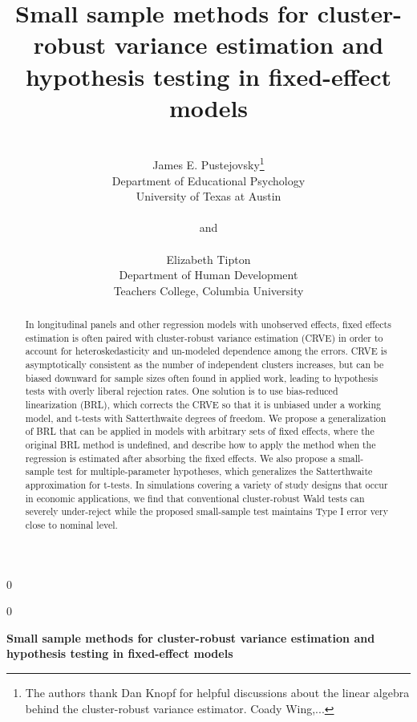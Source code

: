 \documentclass[12pt]{article}\usepackage[]{graphicx}\usepackage[]{color}
\newcommand{\blind}{0}
\begin{document}
\def\spacingset#1{\renewcommand{\baselinestretch}%
{#1}\small\normalsize} \spacingset{1}



\blind
{
  \title{\bf Small sample methods for cluster-robust variance estimation and hypothesis testing in fixed-effect models}
  \author{\\James E. Pustejovsky\thanks{
    The authors thank Dan Knopf for helpful discussions about the linear algebra behind the cluster-robust variance estimator. Coady Wing,...}\hspace{.2cm}\\
    Department of Educational Psychology \\ 
    University of Texas at Austin\\ \\
    and \\ \\
    Elizabeth Tipton \\
    Department of Human Development \\ 
    Teachers College, Columbia University}
  \maketitle
} \fi

\blind
{
  \bigskip
  \bigskip
  \bigskip
  \begin{center}
    {\LARGE\bf Small sample methods for cluster-robust variance estimation and hypothesis testing in fixed-effect models}
\end{center}
  \medskip
} \fi

\bigskip
\begin{abstract}
In longitudinal panels and other regression models with unobserved effects, fixed effects estimation is often paired with cluster-robust variance estimation (CRVE) in order to account for heteroskedasticity and un-modeled dependence among the errors. CRVE is asymptotically consistent as the number of independent clusters increases, but can be biased downward for sample sizes often found in applied work, leading to hypothesis tests with overly liberal rejection rates. One solution is to use bias-reduced linearization (BRL), which corrects the CRVE so that it is unbiased under a working model, and t-tests with Satterthwaite degrees of freedom. We propose a generalization of BRL that can be applied in models with arbitrary sets of fixed effects, where the original BRL method is undefined, and describe how to apply the method when the regression is estimated after absorbing the fixed effects. We also propose a small-sample test for multiple-parameter hypotheses, which generalizes the Satterthwaite approximation for t-tests. In simulations covering a variety of study designs that occur in economic applications, we find that conventional cluster-robust Wald tests can severely under-reject while the proposed small-sample test maintains Type I error very close to nominal level. 
\end{abstract}
\end{document}
